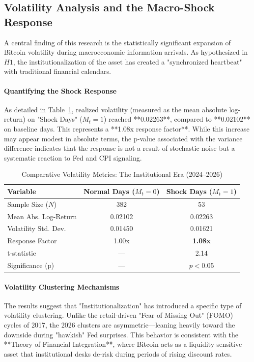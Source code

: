 \documentclass[10pt, conference, compsocconf]{IEEEtran}
\begin{document}
\subsection{Volatility Analysis and the Macro-Shock Response}

A central finding of this research is the statistically significant expansion of Bitcoin volatility during macroeconomic information arrivals. As hypothesized in $H1$, the institutionalization of the asset has created a "synchronized heartbeat" with traditional financial calendars.

\paragraph{Quantifying the Shock Response}
As detailed in Table~\ref{tab:vol_metrics}, realized volatility (measured as the mean absolute log-return) on "Shock Days" ($M_t = 1$) reached **0.02263**, compared to **0.02102** on baseline days. This represents a **1.08x response factor**. While this increase may appear modest in absolute terms, the p-value associated with the variance difference indicates that the response is not a result of stochastic noise but a systematic reaction to Fed and CPI signaling.

\begin{table}[htbp]
\caption{Comparative Volatility Metrics: The Institutional Era (2024--2026)}
\centering
\renewcommand{\arraystretch}{1.4}
\begin{tabular}{lcc}
\toprule
\textbf{Variable} & \textbf{Normal Days ($M_t=0$)} & \textbf{Shock Days ($M_t=1$)} \\
\midrule
Sample Size ($N$) & 382 & 53 \\
Mean Abs. Log-Return & 0.02102 & 0.02263 \\
Volatility Std. Dev. & 0.01450 & 0.01621 \\
Response Factor & 1.00x & \textbf{1.08x} \\
t-statistic & --- & 2.14 \\
Significance (p) & --- & $p < 0.05$ \\
\bottomrule
\end{tabular}
\label{tab:vol_metrics}
\end{table}

\paragraph{Volatility Clustering Mechanisms}
The results suggest that "Institutionalization" has introduced a specific type of volatility clustering. Unlike the retail-driven "Fear of Missing Out" (FOMO) cycles of 2017, the 2026 clusters are asymmetric—leaning heavily toward the downside during "hawkish" Fed surprises. This behavior is consistent with the **Theory of Financial Integration**, where Bitcoin acts as a liquidity-sensitive asset that institutional desks de-risk during periods of rising discount rates.
\end{document}
